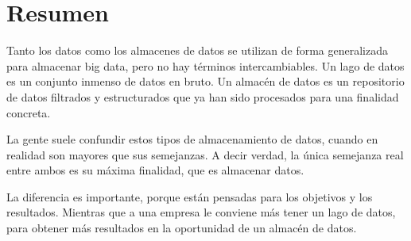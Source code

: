 \section{Resumen}
Tanto los datos como los almacenes de datos se utilizan de forma generalizada para almacenar big data, pero no hay términos intercambiables. Un lago de datos es un conjunto inmenso de datos en bruto. Un almacén de datos es un repositorio de datos filtrados y estructurados que ya han sido procesados ​​para una finalidad concreta.

La gente suele confundir estos tipos de almacenamiento de datos, cuando en realidad son mayores que sus semejanzas. A decir verdad, la única semejanza real entre ambos es su máxima finalidad, que es almacenar datos.

La diferencia es importante, porque están pensadas para los objetivos y los resultados. Mientras que a una empresa le conviene más tener un lago de datos, para obtener más resultados en la oportunidad de un almacén de datos.